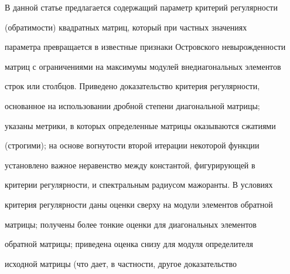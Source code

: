  


\date{} 




 


\pagestyle{plain} %


 


 




 


\maketitle 


\label{begin} 


 


 


 


В данной статье предлагается содержащий параметр критерий регулярности 


(обратимости) квадратных матриц, который при частных значениях  


параметра превращается в известные признаки Островского невырожденности  


матриц с ограничениями на максимумы модулей внедиагональных элементов 


строк или столбцов. Приведено доказательство критерия регулярности, 


основанное на использовании дробной степени диагональной матрицы;  


указаны метрики, в которых определенные матрицы оказываются сжатиями 


(строгими); на основе вогнутости второй итерации некоторой функции 


установлено важное неравенство между константой, фигурирующей в  


критерии регулярности, и спектральным радиусом мажоранты. В условиях 


критерия регулярности даны оценки сверху на модули элементов обратной 


матрицы; получены более тонкие оценки для диагональных элементов 


обратной матрицы; приведена оценка снизу для модуля определителя 


исходной матрицы (что дает, в частности, другое доказательство 


